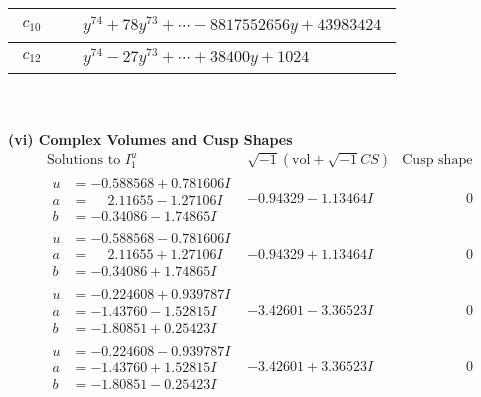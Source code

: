 \documentclass[1p]{elsarticle_modified}
\theoremstyle{definition}
\newcommand{\I}{\sqrt{-1}}
\begin{document}
\begin{tabular}{m{50pt}|m{274pt}}
\hline $$\begin{aligned}c_{10}\end{aligned}$$&$\begin{aligned}
&y^{74}+78 y^{73}+\cdots-8817552656 y+43983424
\end{aligned}$\\
\hline $$\begin{aligned}c_{12}\end{aligned}$$&$\begin{aligned}
&y^{74}-27 y^{73}+\cdots+38400 y+1024
\end{aligned}$\\
\hline
\end{tabular}\\~\\
\newpage\flushleft \textbf{(vi) Complex Volumes and Cusp Shapes}
$$\begin{array}{c|c|c}  
\text{Solutions to }I^u_{1}& \I (\text{vol} + \sqrt{-1}CS) & \text{Cusp shape}\\
 \hline 
\begin{aligned}
u &= -0.588568 + 0.781606 I \\
a &= \phantom{-}2.11655 - 1.27106 I \\
b &= -0.34086 - 1.74865 I\end{aligned}
 & -0.94329 - 1.13464 I & \phantom{-0.000000 } 0 \\ \hline\begin{aligned}
u &= -0.588568 - 0.781606 I \\
a &= \phantom{-}2.11655 + 1.27106 I \\
b &= -0.34086 + 1.74865 I\end{aligned}
 & -0.94329 + 1.13464 I & \phantom{-0.000000 } 0 \\ \hline\begin{aligned}
u &= -0.224608 + 0.939787 I \\
a &= -1.43760 - 1.52815 I \\
b &= -1.80851 + 0.25423 I\end{aligned}
 & -3.42601 - 3.36523 I & \phantom{-0.000000 } 0 \\ \hline\begin{aligned}
u &= -0.224608 - 0.939787 I \\
a &= -1.43760 + 1.52815 I \\
b &= -1.80851 - 0.25423 I\end{aligned}
 & -3.42601 + 3.36523 I & \phantom{-0.000000 } 0 \\ \hline\begin{aligned}

\end{aligned}
\end{array}$$
\end{document}
